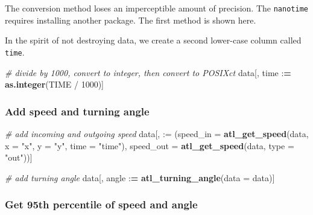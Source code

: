 \documentclass[
]{scrartcl}
\newenvironment{Shaded}{}{}
\newcommand{\CommentTok}[1]{\textcolor[rgb]{0.38,0.63,0.69}{\textit{#1}}}
\newcommand{\DataTypeTok}[1]{\textcolor[rgb]{0.56,0.13,0.00}{#1}}
\newcommand{\DecValTok}[1]{\textcolor[rgb]{0.25,0.63,0.44}{#1}}
\newcommand{\ErrorTok}[1]{\textcolor[rgb]{1.00,0.00,0.00}{\textbf{#1}}}
\newcommand{\KeywordTok}[1]{\textcolor[rgb]{0.00,0.44,0.13}{\textbf{#1}}}
\newcommand{\NormalTok}[1]{#1}
\newcommand{\OperatorTok}[1]{\textcolor[rgb]{0.40,0.40,0.40}{#1}}
\newcommand{\StringTok}[1]{\textcolor[rgb]{0.25,0.44,0.63}{#1}}
\begin{document}
The conversion method loses an imperceptible amount of precision. The \texttt{nanotime} requires installing another package. The first method is shown here.

In the spirit of not destroying data, we create a second lower-case column called \texttt{time}.

\begin{Shaded}
\begin{Highlighting}[]
\CommentTok{\# divide by 1000, convert to integer, then convert to POSIXct}
\NormalTok{data[, time }\OperatorTok{:}\ErrorTok{=}\StringTok{ }\KeywordTok{as.integer}\NormalTok{(TIME }\OperatorTok{/}\StringTok{ }\DecValTok{1000}\NormalTok{)]}
\end{Highlighting}
\end{Shaded}

\hypertarget{add-speed-and-turning-angle}{%
\subsubsection{Add speed and turning angle}\label{add-speed-and-turning-angle}}

\begin{Shaded}
\begin{Highlighting}[]
\CommentTok{\# add incoming and outgoing speed}
\NormalTok{data[, }\StringTok{\textasciigrave{}}\DataTypeTok{:=}\StringTok{\textasciigrave{}}\NormalTok{ (}\DataTypeTok{speed\_in =} \KeywordTok{atl\_get\_speed}\NormalTok{(data, }
                                      \DataTypeTok{x =} \StringTok{"x"}\NormalTok{, }
                                      \DataTypeTok{y =} \StringTok{"y"}\NormalTok{, }
                                      \DataTypeTok{time =} \StringTok{"time"}\NormalTok{),}
             \DataTypeTok{speed\_out =} \KeywordTok{atl\_get\_speed}\NormalTok{(data, }\DataTypeTok{type =} \StringTok{"out"}\NormalTok{))]}

\CommentTok{\# add turning angle}
\NormalTok{data[, angle }\OperatorTok{:}\ErrorTok{=}\StringTok{ }\KeywordTok{atl\_turning\_angle}\NormalTok{(}\DataTypeTok{data =}\NormalTok{ data)]}
\end{Highlighting}
\end{Shaded}

\hypertarget{get-95th-percentile-of-speed-and-angle}{%
\subsubsection{Get 95th percentile of speed and angle}\label{get-95th-percentile-of-speed-and-angle}}
\end{document}
